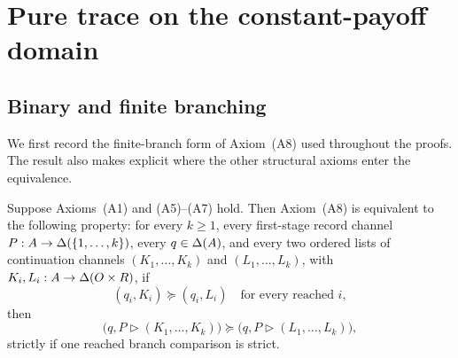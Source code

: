 \section{Pure trace on the constant-payoff domain}
\label{pt:sec:environment}\label{lf:app:pure-trace}

\subsection{Binary and finite branching}

We first record the finite-branch form of Axiom~\textup{(A8)} used throughout the proofs.  The result also makes
explicit where the other structural axioms enter the equivalence.

\begin{lemma}\label{pt:lem:finite-branch-extension}
Suppose Axioms~\textup{(A1)} and \textup{(A5)--(A7)} hold.  Then Axiom~\textup{(A8)} is equivalent to the
following property: for every $k\ge1$, every first-stage record channel
$P:A\to\Delta(\{1,\ldots,k\})$, every $q\in\Delta(A)$, and every
two ordered lists of continuation channels $(K_1,\ldots,K_k)$ and $(L_1,\ldots,L_k)$, with
$K_i,L_i:A\to\Delta(O\times R)$, if
\[
 (q_i,K_i)\succeq(q_i,L_i)
 \quad\text{for every reached }i,
\]
then
\begin{equation}
 \bigl(q,P\triangleright(K_1,\ldots,K_k)\bigr)
 \succeq
 \bigl(q,P\triangleright(L_1,\ldots,L_k)\bigr),
 \label{pt:eq:finite-branch-extension}
\end{equation}
strictly if one reached branch comparison is strict.
\end{lemma}

